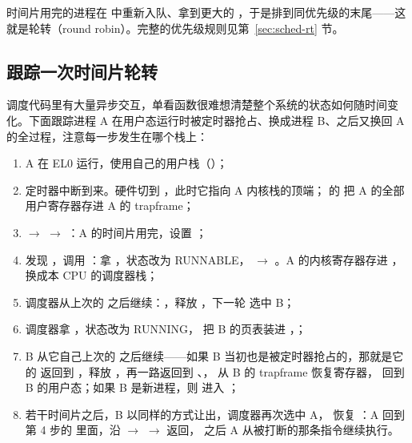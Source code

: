 时间片用完的进程在  中重新入队、拿到更大的 ，于是排到同优先级的末尾——这就是轮转（round robin）。完整的优先级规则见第~\ref{sec:sched-rt} 节。

\subsection{跟踪一次时间片轮转}
\label{sec:sched-trace}

调度代码里有大量异步交互，单看函数很难想清楚整个系统的状态如何随时间变化。下面跟踪进程 A 在用户态运行时被定时器抢占、换成进程 B、之后又换回 A 的全过程，注意每一步发生在哪个栈上：

\begin{enumerate}
  \item A 在 EL0 运行，使用自己的用户栈（）；
  \item 定时器中断到来。硬件切到 ，此时它指向 A 内核栈的顶端； 的  把 A 的全部用户寄存器存进 A 的 trapframe；
  \item {} $\to$  $\to$ ：A 的时间片用完，设置 ；
  \item {} 发现 ，调用 ：拿 ，状态改为 RUNNABLE， $\to$ 。A 的内核寄存器存进 ， 换成本 CPU 的调度器栈；
  \item 调度器从上次的  之后继续：，释放 ，下一轮  选中 B；
  \item 调度器拿 ，状态改为 RUNNING， 把 B 的页表装进 ，；
  \item B 从它自己上次的  之后继续——如果 B 当初也是被定时器抢占的，那就是它的  返回到 ，释放 ，再一路返回到 、， 从 B 的 trapframe 恢复寄存器， 回到 B 的用户态；如果 B 是新进程，则  进入 ；
  \item 若干时间片之后，B 以同样的方式让出，调度器再次选中 A， 恢复 ：A 回到第 4 步的  里面，沿  $\to$  $\to$  返回， 之后 A 从被打断的那条指令继续执行。
\end{enumerate}

